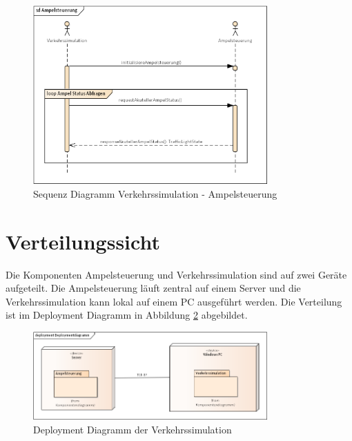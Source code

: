 \begin{figure}[H]
\begin{center}
	\includegraphics[width=0.8\textwidth]{BilderAllgemein/Ampelsteuerung.png}
\end{center}
	\caption{Sequenz Diagramm Verkehrssimulation - Ampelsteuerung}
	\label{fig_2_2}
\end{figure}

\section{Verteilungssicht}
\label{Verteilungssicht}

Die Komponenten Ampelsteuerung und Verkehrssimulation sind auf zwei Geräte aufgeteilt. Die Ampelsteuerung läuft zentral auf einem Server und die Verkehrssimulation kann lokal auf einem PC
ausgeführt werden. Die Verteilung ist im Deployment Diagramm in Abbildung \ref{fig_2_3} abgebildet.

\begin{figure}[H]
\begin{center}
	\includegraphics[width=0.8\textwidth]{BilderAllgemein/Deploymentdiagramm.png}
\end{center}
	\caption{Deployment Diagramm der Verkehrssimulation}
	\label{fig_2_3}
\end{figure}

